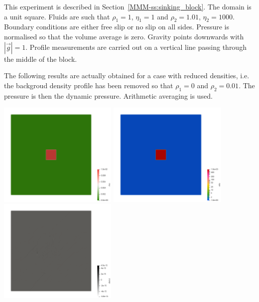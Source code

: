 This experiment is described in Section~\ref{MMM-ss:sinking_block}.
The domain is a unit square. Fluids are such that 
$\rho_1=1$, $\eta_1=1$ and $\rho_2=1.01$, $\eta_2=1000$.
Boundary conditions are either free slip or no slip on all sides. 
Pressure is normalised so that the volume average is zero. 
Gravity points downwards with $|\vec{g}|=1$.
Profile measurements are carried out on a vertical line 
passing through the middle of the block.

The following results are actually obtained for a case with reduced 
densities, i.e. the backgroud density profile has been removed so that 
$\rho_1=0$ and $\rho_2=0.01$. The pressure is then the dynamic pressure.
Arithmetic averaging is used.

\begin{center}
\includegraphics[width=5.7cm]{python_codes/fieldstone_158/results/exp5/rho}
\includegraphics[width=5.7cm]{python_codes/fieldstone_158/results/exp5/eta}
\includegraphics[width=5.7cm]{python_codes/fieldstone_158/results/exp5/divv}\\

\end{center}
